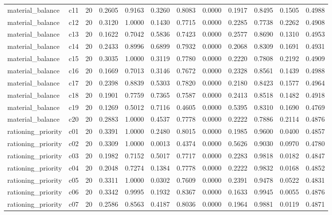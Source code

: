 \begin{table}[htbp]
\begin{tabular}{lrrrrrrrrrrr}
material\_balance & c11 & 20 & 0.2605 & 0.9163 & 0.3260 & 0.8083 & 0.0000 & 0.1917 & 0.8495 & 0.1505 & 0.4988 \\
material\_balance & c12 & 20 & 0.3120 & 1.0000 & 0.1430 & 0.7715 & 0.0000 & 0.2285 & 0.7738 & 0.2262 & 0.4908 \\
material\_balance & c13 & 20 & 0.1622 & 0.7042 & 0.5836 & 0.7423 & 0.0000 & 0.2577 & 0.8690 & 0.1310 & 0.4953 \\
material\_balance & c14 & 20 & 0.2433 & 0.8996 & 0.6899 & 0.7932 & 0.0000 & 0.2068 & 0.8309 & 0.1691 & 0.4931 \\
material\_balance & c15 & 20 & 0.3035 & 1.0000 & 0.3119 & 0.7780 & 0.0000 & 0.2220 & 0.7808 & 0.2192 & 0.4909 \\
material\_balance & c16 & 20 & 0.1669 & 0.7013 & 0.3146 & 0.7672 & 0.0000 & 0.2328 & 0.8561 & 0.1439 & 0.4988 \\
material\_balance & c17 & 20 & 0.2398 & 0.8839 & 0.5303 & 0.7820 & 0.0000 & 0.2180 & 0.8423 & 0.1577 & 0.4964 \\
material\_balance & c18 & 20 & 0.1901 & 0.7759 & 0.7365 & 0.7587 & 0.0000 & 0.2413 & 0.8518 & 0.1482 & 0.4918 \\
material\_balance & c19 & 20 & 0.1269 & 0.5012 & 0.7116 & 0.4605 & 0.0000 & 0.5395 & 0.8310 & 0.1690 & 0.4769 \\
material\_balance & c20 & 20 & 0.2883 & 1.0000 & 0.4537 & 0.7778 & 0.0000 & 0.2222 & 0.7886 & 0.2114 & 0.4876 \\
rationing\_priority & c01 & 20 & 0.3391 & 1.0000 & 0.2480 & 0.8015 & 0.0000 & 0.1985 & 0.9600 & 0.0400 & 0.4857 \\
rationing\_priority & c02 & 20 & 0.3309 & 1.0000 & 0.0013 & 0.4374 & 0.0000 & 0.5626 & 0.9030 & 0.0970 & 0.4780 \\
rationing\_priority & c03 & 20 & 0.1982 & 0.7152 & 0.5017 & 0.7717 & 0.0000 & 0.2283 & 0.9818 & 0.0182 & 0.4847 \\
rationing\_priority & c04 & 20 & 0.2048 & 0.7274 & 0.1384 & 0.7778 & 0.0000 & 0.2222 & 0.9832 & 0.0168 & 0.4852 \\
rationing\_priority & c05 & 20 & 0.3311 & 1.0000 & 0.0302 & 0.7609 & 0.0000 & 0.2391 & 0.9478 & 0.0522 & 0.4831 \\
rationing\_priority & c06 & 20 & 0.3342 & 0.9995 & 0.1932 & 0.8367 & 0.0000 & 0.1633 & 0.9945 & 0.0055 & 0.4876 \\
rationing\_priority & c07 & 20 & 0.2586 & 0.8563 & 0.4187 & 0.8036 & 0.0000 & 0.1964 & 0.9881 & 0.0119 & 0.4871 \\

\end{tabular}
\end{table}
